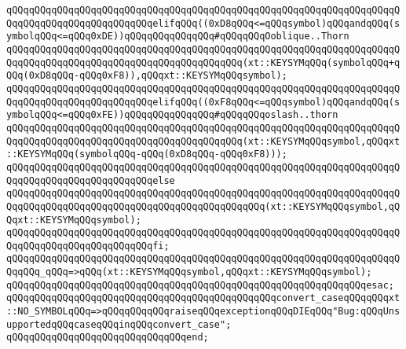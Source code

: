 \newline
\verb|qQQqqQQqqQQqqQQqqQQqqQQqqQQqqQQqqQQqqQQqqQQqqQQqqQQqqQQqqQQqqQQqqQQqqQQqqQQqqQQqqQQqqQQqqQQqqQQqelifqQQq((0xD8qQQq<=qQQqsymbol)qQQqandqQQq(symbolqQQq<=qQQq0xDE))qQQqqQQqqQQqqQQq#qQQqqQQqOoblique..Thorn|\newline
\newline
\verb|qQQqqQQqqQQqqQQqqQQqqQQqqQQqqQQqqQQqqQQqqQQqqQQqqQQqqQQqqQQqqQQqqQQqqQQqqQQqqQQqqQQqqQQqqQQqqQQqqQQqqQQqqQQqqQQq(xt::KEYSYMqQQq(symbolqQQq+qQQq(0xD8qQQq-qQQq0xF8)),qQQqxt::KEYSYMqQQqsymbol);|\newline
\newline
\verb|qQQqqQQqqQQqqQQqqQQqqQQqqQQqqQQqqQQqqQQqqQQqqQQqqQQqqQQqqQQqqQQqqQQqqQQqqQQqqQQqqQQqqQQqqQQqqQQqelifqQQq((0xF8qQQq<=qQQqsymbol)qQQqandqQQq(symbolqQQq<=qQQq0xFE))qQQqqQQqqQQqqQQq#qQQqqQQqoslash..thorn|\newline
\newline
\verb|qQQqqQQqqQQqqQQqqQQqqQQqqQQqqQQqqQQqqQQqqQQqqQQqqQQqqQQqqQQqqQQqqQQqqQQqqQQqqQQqqQQqqQQqqQQqqQQqqQQqqQQqqQQqqQQq(xt::KEYSYMqQQqsymbol,qQQqxt::KEYSYMqQQq(symbolqQQq-qQQq(0xD8qQQq-qQQq0xF8)));|\newline
\newline
\verb|qQQqqQQqqQQqqQQqqQQqqQQqqQQqqQQqqQQqqQQqqQQqqQQqqQQqqQQqqQQqqQQqqQQqqQQqqQQqqQQqqQQqqQQqqQQqqQQqelse|\newline
\newline
\verb|qQQqqQQqqQQqqQQqqQQqqQQqqQQqqQQqqQQqqQQqqQQqqQQqqQQqqQQqqQQqqQQqqQQqqQQqqQQqqQQqqQQqqQQqqQQqqQQqqQQqqQQqqQQqqQQqqQQq(xt::KEYSYMqQQqsymbol,qQQqxt::KEYSYMqQQqsymbol);|\newline
\verb|qQQqqQQqqQQqqQQqqQQqqQQqqQQqqQQqqQQqqQQqqQQqqQQqqQQqqQQqqQQqqQQqqQQqqQQqqQQqqQQqqQQqqQQqqQQqqQQqfi;|\newline
\newline
\verb|qQQqqQQqqQQqqQQqqQQqqQQqqQQqqQQqqQQqqQQqqQQqqQQqqQQqqQQqqQQqqQQqqQQqqQQqqQQq_qQQq=>qQQq(xt::KEYSYMqQQqsymbol,qQQqxt::KEYSYMqQQqsymbol);|\newline
\verb|qQQqqQQqqQQqqQQqqQQqqQQqqQQqqQQqqQQqqQQqqQQqqQQqqQQqqQQqqQQqqQQqesac;|\newline
\newline
\verb|qQQqqQQqqQQqqQQqqQQqqQQqqQQqqQQqqQQqqQQqqQQqqQQqconvert_caseqQQqqQQqxt::NO_SYMBOLqQQq=>qQQqqQQqqQQqraiseqQQqexceptionqQQqDIEqQQq"Bug:qQQqUnsupportedqQQqcaseqQQqinqQQqconvert_case";|\newline
\verb|qQQqqQQqqQQqqQQqqQQqqQQqqQQqqQQqend;|\newline
\newline

